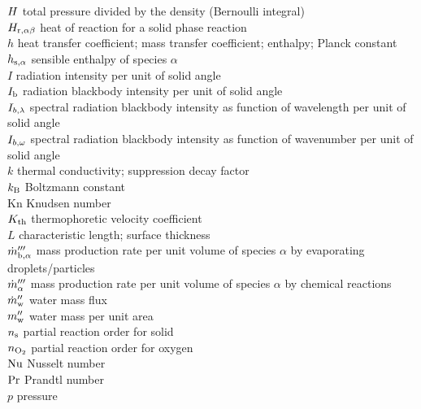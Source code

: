 \begin{tabbing}
$H$                      \> total pressure divided by the density (Bernoulli integral)\\
$H_{{\rm r},\alpha\beta}$ \> heat of reaction for a solid phase reaction     \\
$h$                       \> heat transfer coefficient; mass transfer coefficient; enthalpy; Planck constant      \\
$h_{\rm s,\alpha}$        \> sensible enthalpy of species $\alpha$   \\
$I$                       \> radiation intensity per unit of solid angle     \\
$I_{\rm b}$               \> radiation blackbody intensity per unit of solid angle  \\
$I_{b,\rm \lambda}$           \> spectral radiation blackbody intensity as function of wavelength per unit of solid angle  \\
$I_{b,\rm \omega}$           \> spectral radiation blackbody intensity as function of wavenumber per unit of solid angle  \\
$k$                       \> thermal conductivity; suppression decay factor \\
$k_{\rm B}$               \> Boltzmann constant                             \\
Kn                        \> Knudsen number \\
$K_{\rm th}$              \> thermophoretic velocity coefficient \\
$L$                       \> characteristic length; surface thickness \\
$\dot{m}_{{\rm b},\alpha}'''$ \> mass production rate per unit volume of species $\alpha$ by evaporating droplets/particles \\
$\dot{m}_\alpha'''$           \> mass production rate per unit volume of species $\alpha$ by chemical reactions \\
$\dot{m}_{\rm w}''$           \> water mass flux  \\
$m_{\rm w}''$             \> water mass per unit area \\
$n_{\rm s}$               \> partial reaction order for solid \\
$n_{\rm O_2}$             \> partial reaction order for oxygen \\
$\hbox{Nu}$                     \> Nusselt number \\
$\hbox{Pr}$                     \> Prandtl number \\
$p$                       \> pressure \\

\end{tabbing}
